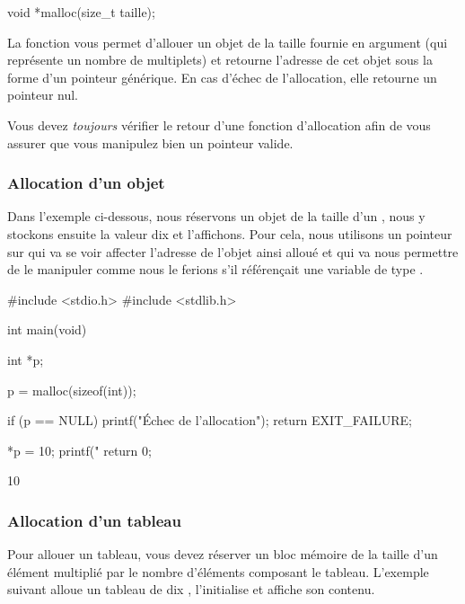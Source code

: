 \begin{C}
void *malloc(size_t taille);
\end{C}

La fonction  vous permet d'allouer un objet de la
taille fournie en argument (qui représente un nombre de multiplets) et
retourne l'adresse de cet objet sous la forme d'un pointeur générique.
En cas d'échec de l'allocation, elle retourne un pointeur nul.

\begin{attentionbox} 
 Vous devez \emph{toujours} vérifier le
retour d'une fonction d'allocation afin de vous assurer que vous
manipulez bien un pointeur valide.
\end{attentionbox}


\subsubsection{Allocation d'un objet}
\label{allocation-dun-objet}

Dans l'exemple ci-dessous, nous réservons un objet de la taille d'un
, nous y stockons ensuite la valeur dix et l'affichons. Pour
cela, nous utilisons un pointeur sur  qui va se voir
affecter l'adresse de l'objet ainsi alloué et qui va nous permettre de
le manipuler comme nous le ferions s'il référençait une variable de type
.

\begin{C}
#include <stdio.h>
#include <stdlib.h>


int main(void)
{
    int *p;

    p = malloc(sizeof(int));

    if (p == NULL)
    {
        printf("Échec de l'allocation\n");
        return EXIT_FAILURE;
    }

    *p = 10;
    printf("%
    return 0;
}
\end{C}

\begin{C}
10
\end{C}

\subsubsection{Allocation d'un tableau}
\label{allocation-dun-tableau}

Pour allouer un tableau, vous devez réserver un bloc mémoire de la
taille d'un élément multiplié par le nombre d'éléments composant le
tableau. L'exemple suivant alloue un tableau de dix ,
l'initialise et affiche son contenu.

